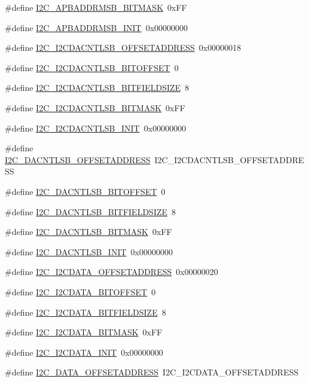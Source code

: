 \begin{DoxyCompactItemize}
\#define \hyperlink{a00558_afcf3211df6cf01368db2a03999d90d26}{I2C\_\-APBADDRMSB\_\-BITMASK}~0xFF
\item 
\#define \hyperlink{a00558_ae0f0508ac02059e3b48eecbb622f059d}{I2C\_\-APBADDRMSB\_\-INIT}~0x00000000
\item 
\#define \hyperlink{a00558_acb72fef5f6cdc6410270736171b4b242}{I2C\_\-I2CDACNTLSB\_\-OFFSETADDRESS}~0x00000018
\item 
\#define \hyperlink{a00558_aaf98189dc8844d96948a2a10667a6237}{I2C\_\-I2CDACNTLSB\_\-BITOFFSET}~0
\item 
\#define \hyperlink{a00558_a787b1fba1a769c9b4e374185371c5ff3}{I2C\_\-I2CDACNTLSB\_\-BITFIELDSIZE}~8
\item 
\#define \hyperlink{a00558_a3502600842755c9d2be4dd556b753d4a}{I2C\_\-I2CDACNTLSB\_\-BITMASK}~0xFF
\item 
\#define \hyperlink{a00558_a9789fbd6189dbc9d32ec3b46e7800f02}{I2C\_\-I2CDACNTLSB\_\-INIT}~0x00000000
\item 
\#define \hyperlink{a00558_ae600b2a76b934955c324f82b35fa805b}{I2C\_\-DACNTLSB\_\-OFFSETADDRESS}~I2C\_\-I2CDACNTLSB\_\-OFFSETADDRESS
\item 
\#define \hyperlink{a00558_a0f0e4555e0da2f09ab5696bef3bd4dac}{I2C\_\-DACNTLSB\_\-BITOFFSET}~0
\item 
\#define \hyperlink{a00558_a5ca80e350f9d22248a4aad421b39c1d4}{I2C\_\-DACNTLSB\_\-BITFIELDSIZE}~8
\item 
\#define \hyperlink{a00558_ac62a5e25cf8f2c123d2544e679b0aa93}{I2C\_\-DACNTLSB\_\-BITMASK}~0xFF
\item 
\#define \hyperlink{a00558_afaea3c3b604960847f3d3da0dd2708e6}{I2C\_\-DACNTLSB\_\-INIT}~0x00000000
\item 
\#define \hyperlink{a00558_ae7a3d0cf7765c1864dce99ab990914ed}{I2C\_\-I2CDATA\_\-OFFSETADDRESS}~0x00000020
\item 
\#define \hyperlink{a00558_ac6e18e4f3fde7f113689d9be992e1bec}{I2C\_\-I2CDATA\_\-BITOFFSET}~0
\item 
\#define \hyperlink{a00558_aa6480fdd06a972513e81833de23028e1}{I2C\_\-I2CDATA\_\-BITFIELDSIZE}~8
\item 
\#define \hyperlink{a00558_ab0854e83366d5b74d0180c2e655d40ce}{I2C\_\-I2CDATA\_\-BITMASK}~0xFF
\item 
\#define \hyperlink{a00558_a32b2804d53d739e56599c5c47f075f83}{I2C\_\-I2CDATA\_\-INIT}~0x00000000
\item 
\#define \hyperlink{a00558_ac1901b75b0d0f56a95e66ff7e9622b51}{I2C\_\-DATA\_\-OFFSETADDRESS}~I2C\_\-I2CDATA\_\-OFFSETADDRESS

\end{DoxyCompactItemize}
